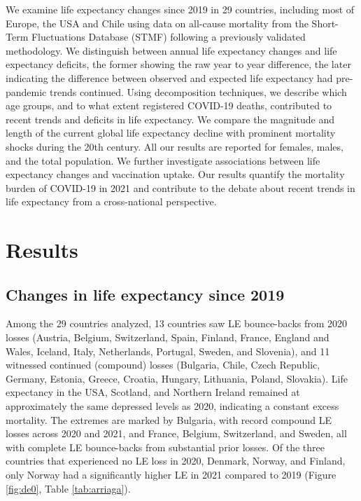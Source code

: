 \documentclass[12pt]{article}
\begin{document}
We examine life expectancy changes since 2019 in 29 countries, including most of Europe, the USA and Chile using data on all-cause mortality from the Short-Term Fluctuations Database (STMF)\citealp{Nemeth2021} following a previously validated methodology.\citealp{Aburto2021b} We distinguish between annual life expectancy changes and life expectancy deficits, the former showing the raw year to year difference, the later indicating the difference between observed and expected life expectancy had pre-pandemic trends continued. Using decomposition techniques, we describe which age groups, and to what extent registered COVID-19 deaths, contributed to recent trends and deficits in life expectancy. We compare the magnitude and length of the current global life expectancy decline with prominent mortality shocks during the 20th century. All our results are reported for females, males, and the total population. We further investigate associations between life expectancy changes and vaccination uptake. Our results quantify the mortality burden of COVID-19 in 2021 and contribute to the debate about recent trends in life expectancy from a cross-national perspective.

\section*{Results}

\subsection*{Changes in life expectancy since 2019}

Among the 29 countries analyzed, 13 countries saw LE bounce-backs from 2020 losses (Austria, Belgium, Switzerland, Spain, Finland, France, England and Wales, Iceland, Italy, Netherlands, Portugal, Sweden, and Slovenia), and 11 witnessed continued (compound) losses (Bulgaria, Chile, Czech Republic, Germany, Estonia, Greece, Croatia, Hungary, Lithuania, Poland, Slovakia). Life expectancy in the USA, Scotland, and Northern Ireland remained at approximately the same depressed levels as 2020, indicating a constant excess mortality. The extremes are marked by Bulgaria, with record compound LE losses across 2020 and 2021, and France, Belgium, Switzerland, and Sweden, all with complete LE bounce-backs from substantial prior losses. Of the three countries that experienced no LE loss in 2020, Denmark, Norway, and Finland, only Norway had a significantly higher LE in 2021 compared to 2019 (Figure \ref{fig:de0}, Table \ref{tab:arriaga}).
\end{document}
